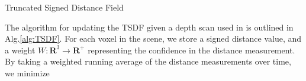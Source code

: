 \documentclass[10pt,twocolumn,letterpaper]{article}
\newcommand{\algoref}[1]{Alg.\ref{#1}}
\begin{document}
% 
% 
% 

\begin{algorithm}[t!]
	\caption{Truncated Signed Distance Field}
	\label{alg:TSDF}
	\begin{algorithmic}[1]
		 
			 
				 
				\label{alg:line:dynamic_tsdf}
			     
				    	\label{alg:line:voxel_carve}
					\EndIf
			    \EndFor
				 		 
					\label{alg:line:tsdf_update}
				\EndFor
			\EndFor
		\EndFor
	\end{algorithmic}
\end{algorithm}

The algorithm for updating the TSDF given a depth scan used in
\cite{Curless1996, Newcombe, Whelan2013, Bylow2013} is outlined in
\algoref{alg:TSDF}. For each voxel in the scene, we store a signed distance
value, and a weight $W : \mathbf{R}^3 \to \mathbf{R^{+}}$ representing the confidence
in the distance measurement. By taking a weighted running average of the
distance measurements over time, we minimize 
\end{document}
